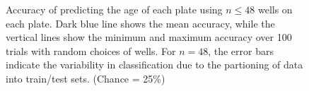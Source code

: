 \documentclass{article}
\begin{document}
\begin{figure}
  \centering
  \caption{Accuracy of predicting the age of each plate using $n
    \leq 48$ wells on each plate. Dark blue line shows the mean
    accuracy, while the vertical lines show the minimum and
    maximum accuracy over 100 trials with random choices of
    wells.  For $n=48$, the error bars indicate the variability
    in classification due to the partioning of data into
    train/test sets.  (Chance = 25\%) }
\end{figure}
\end{document}
